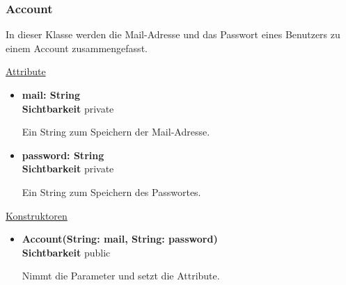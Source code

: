 \newpage
\subsubsection{Account}\label{Account}
In dieser Klasse werden die Mail-Adresse und das Passwort eines Benutzers zu einem Account zusammengefasst. \newline

\underline{Attribute}
\begin{itemize}
\itemsep0pt
\item \textbf{mail: String} \hfill\\
\textbf{Sichtbarkeit} private
 
Ein String zum Speichern der Mail-Adresse.

\item \textbf{password: String} \hfill\\ 
\textbf{Sichtbarkeit} private

Ein String zum Speichern des Passwortes.

\end{itemize}

\underline{Konstruktoren}
\begin{itemize}
\itemsep0pt
\item \textbf{Account(String: mail, String: password)} \hfill\\
\textbf{Sichtbarkeit} public

Nimmt die Parameter und setzt die Attribute.
\end{itemize}
